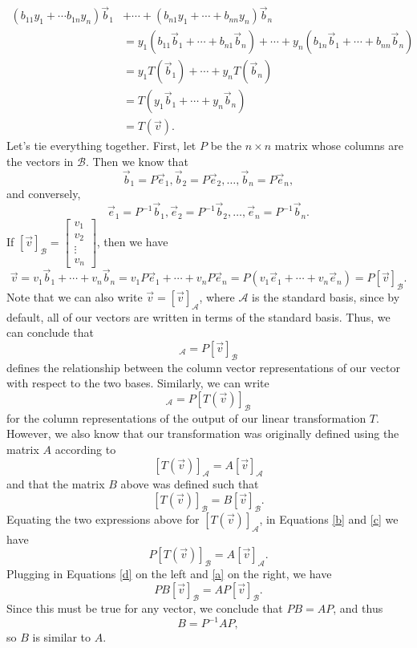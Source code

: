 \documentclass[12pt,letterpaper]{article}
\newcommand{\bbm}{\begin{bmatrix}}
\newcommand{\ebm}{\end{bmatrix}}
\begin{document}
\begin{align*}
 (b_{11}y_1+\cdots b_{1n}y_n)\vec{b}_1 & +  \cdots + (b_{n1}y_1+\cdots + b_{nn}y_n)\vec{b}_n\\
& = y_1(b_{11}\vec{b}_1+\cdots + b_{n1}\vec{b}_n) +   \cdots + y_n(b_{1n}\vec{b}_1+\cdots + b_{nn}\vec{b}_n)\\
& = y_1T(\vec{b}_1) +  \cdots + y_nT(\vec{b}_n)\\
& = T(y_1\vec{b}_1 +  \cdots + y_n\vec{b}_n)\\
& = T(\vec{v}).
\end{align*}
Let's tie everything together. First, let $P$ be the $n\times n$ matrix whose columns are the vectors in $\mathcal{B}$. Then we know that
\[
 \vec{b}_1 = P\vec{e}_1, \vec{b}_2=P\vec{e}_2, \ldots, \vec{b}_n = P\vec{e}_n,
\]
and conversely,
\[
 \vec{e}_1 = P^{-1}\vec{b}_1, \vec{e}_2 = P^{-1}\vec{b}_2, \ldots, \vec{e}_n = P^{-1}\vec{b}_n.
\]
If $[\vec{v}]_{\mathcal{B}} = \bbm v_1\\v_2\\\vdots \\v_n\ebm$, then we have
\[
 \vec{v} = v_1\vec{b}_1 +\cdots + v_n\vec{b}_n = v_1P\vec{e}_1 +\cdots +v_nP\vec{e}_n = P(v_1\vec{e}_1+\cdots + v_n\vec{e}_n) = P[\vec{v}]_{\mathcal{B}}.
\]
Note that we can also write $\vec{v} = [\vec{v}]_{\mathcal{A}}$, where $\mathcal{A}$ is the standard basis, since by default, all of our vectors are written in terms of the standard basis. Thus, we can conclude that
\begin{equation}
 [\vec{v}]_{\mathcal{A}} = P[\vec{v}]_{\mathcal{B}}\label{a}
\end{equation}
defines the relationship between the column vector representations of our vector with respect to the two bases. Similarly, we can write
\begin{equation}
 [T(\vec{v})]_{\mathcal{A}} = P[T(\vec{v})]_{\mathcal{B}}\label{b}
\end{equation}
for the column representations of the output of our linear transformation $T$. However, we also know that our transformation was originally defined using the matrix $A$ according to
\begin{equation}\label{c}
 [T(\vec{v})]_{\mathcal{A}} = A[\vec{v}]_{\mathcal{A}}
\end{equation}
and that the matrix $B$ above was defined such that
\begin{equation}\label{d}
 [T(\vec{v})]_{\mathcal{B}} = B[\vec{v}]_{\mathcal{B}}.
\end{equation}
Equating the two expressions above for $[T(\vec{v})]_{\mathcal{A}}$, in Equations \eqref{b} and \eqref{c} we have
\[
 P[T(\vec{v})]_{\mathcal{B}} = A[\vec{v}]_{\mathcal{A}}.
\]
Plugging in Equations \eqref{d} on the left and \eqref{a} on the right, we have
\[
 PB[\vec{v}]_{\mathcal{B}} = AP[\vec{v}]_{\mathcal{B}}.
\]
Since this must be true for any vector, we conclude that $PB = AP$, and thus
\[
 B = P^{-1}AP,
\]
so $B$ is similar to $A$.
\end{document}
